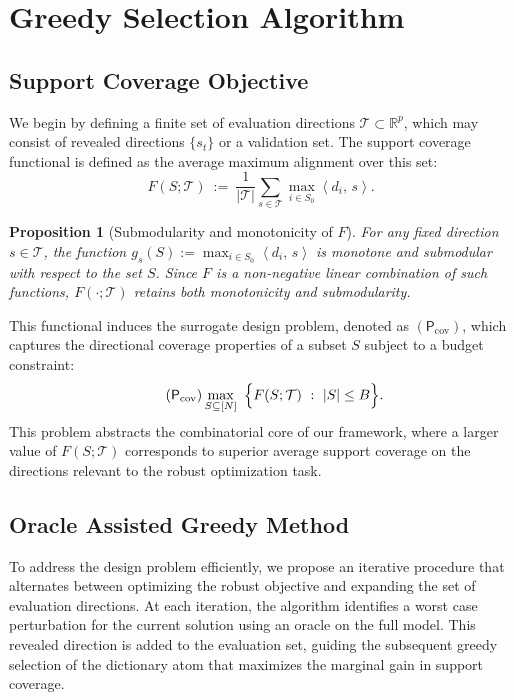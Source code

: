 \documentclass[accepted]{uai2026}
\theoremstyle{plain}
\newtheorem{proposition}[theorem]{Proposition}
\theoremstyle{definition}
\theoremstyle{remark}
\newcommand{\R}{\mathbb{R}}
\newcommand{\ip}[2]{\left\langle #1 ,\, #2 \right\rangle}
\begin{document}
\section{Greedy Selection Algorithm}

\subsection{Support Coverage Objective}

We begin by defining a finite set of evaluation directions $\mathcal{T}\subset\R^p$, which may consist of revealed directions $\{s_t\}$ or a validation set. The support coverage functional is defined as the average maximum alignment over this set:
\begin{equation}\label{eq:F}
F(S;\mathcal{T})\ :=\ \frac{1}{|\mathcal{T}|}\sum_{s\in \mathcal{T}}\max_{i\in S_0}\ip{d_i}{s}.
\end{equation}

\begin{proposition}[Submodularity and monotonicity of $F$]\label{prop:submod}
For any fixed direction $s\in\mathcal T$, the function $g_s(S):=\max_{i\in S_0}\ip{d_i}{s}$ is monotone and submodular with respect to the set $S$. Since $F$ is a non-negative linear combination of such functions, $F(\cdot;\mathcal{T})$ retains both monotonicity and submodularity.
\end{proposition}

This functional induces the surrogate design problem, denoted as $(\mathsf{P}_{\mathrm{cov}})$, which captures the directional coverage properties of a subset $S$ subject to a budget constraint:
\begin{equation}\label{eq:cov-design}
\tag{$\mathsf{P}_{\mathrm{cov}}$}
\max_{S\subseteq[N]}\ \Big\{ F(S;\mathcal T)\ :\ |S|\le B \Big\}.
\end{equation}
This problem abstracts the combinatorial core of our framework, where a larger value of $F(S;\mathcal T)$ corresponds to superior average support coverage on the directions relevant to the robust optimization task.

\subsection{Oracle Assisted Greedy Method}
\label{sec:alg}

To address the design problem efficiently, we propose an iterative procedure that alternates between optimizing the robust objective and expanding the set of evaluation directions. At each iteration, the algorithm identifies a worst case perturbation for the current solution using an oracle on the full model. This revealed direction is added to the evaluation set, guiding the subsequent greedy selection of the dictionary atom that maximizes the marginal gain in support coverage.
\end{document}
